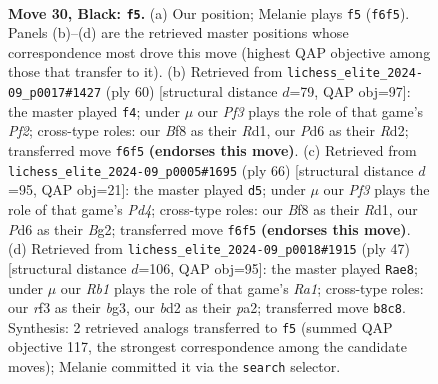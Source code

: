 \documentclass[11pt]{article}
\begin{document}
\clearpage

\begin{figure}[p]\centering
\begin{subfigure}{0.46\textwidth}\centering
\resizebox{\linewidth}{!}{%
\newchessgame
\chessboard[
  setfen={1r3b2/n3rk2/p2p1pp1/3P3p/Rpq1P3/5R1P/1Q1BNPP1/5K2 b - - 3 30},
  showmover=false,
  pgfstyle=straightmove, color=movearrow, markmove={f6-f5}
]}
\caption{}
\end{subfigure}\hfill
\begin{subfigure}{0.46\textwidth}\centering
\resizebox{\linewidth}{!}{%
\newchessgame
\chessboard[
  setfen={3r4/2rPqpk1/6pp/ppb1P3/2p1Q3/P5PB/1P1R1PK1/3R4 w - - 0 31},
  showmover=false,
  pgfstyle=straightmove, color=movearrow, markmove={f2-f4}
]}
\caption{}
\end{subfigure}
\\[4pt]
\begin{subfigure}{0.46\textwidth}\centering
\resizebox{\linewidth}{!}{%
\newchessgame
\chessboard[
  setfen={1r1r4/Q4pk1/1p2p1p1/7p/2nP3P/P1q3P1/5PB1/3RR1K1 w - - 0 34},
  showmover=false,
  pgfstyle=straightmove, color=movearrow, markmove={d4-d5}
]}
\caption{}
\end{subfigure}\hfill
\begin{subfigure}{0.46\textwidth}\centering
\resizebox{\linewidth}{!}{%
\newchessgame
\chessboard[
  setfen={r4rk1/1p2Rpb1/3p4/7p/p1Pq2pP/6B1/PPQN1PP1/6K1 b - - 0 24},
  showmover=false,
  pgfstyle=straightmove, color=movearrow, markmove={a8-e8}
]}
\caption{}
\end{subfigure}
\caption{\textbf{Move 30, Black: \texttt{f5}.} (a) Our position; Melanie plays \texttt{f5} (\texttt{f6f5}). Panels (b)--(d) are the retrieved master positions whose correspondence most drove this move (highest QAP objective among those that transfer to it). (b) Retrieved from \texttt{lichess\_elite\_2024-09\_p0017\#1427} (ply 60) [structural distance $d$=79, QAP obj=97]: the master played \texttt{f4}; under $\mu$ our \emph{Pf3} plays the role of that game's \emph{Pf2}; cross-type roles: our \emph{B}f8 as their \emph{R}d1, our \emph{P}d6 as their \emph{R}d2; transferred move \texttt{f6f5} \textbf{(endorses this move)}. (c) Retrieved from \texttt{lichess\_elite\_2024-09\_p0005\#1695} (ply 66) [structural distance $d$=95, QAP obj=21]: the master played \texttt{d5}; under $\mu$ our \emph{Pf3} plays the role of that game's \emph{Pd4}; cross-type roles: our \emph{B}f8 as their \emph{R}d1, our \emph{P}d6 as their \emph{B}g2; transferred move \texttt{f6f5} \textbf{(endorses this move)}. (d) Retrieved from \texttt{lichess\_elite\_2024-09\_p0018\#1915} (ply 47) [structural distance $d$=106, QAP obj=95]: the master played \texttt{Rae8}; under $\mu$ our \emph{Rb1} plays the role of that game's \emph{Ra1}; cross-type roles: our \emph{r}f3 as their \emph{b}g3, our \emph{b}d2 as their \emph{p}a2; transferred move \texttt{b8c8}. Synthesis: 2 retrieved analogs transferred to \texttt{f5} (summed QAP objective 117, the strongest correspondence among the candidate moves); Melanie committed it via the \texttt{search} selector.}
\label{fig:thought-m59}
\end{figure}
\end{document}
